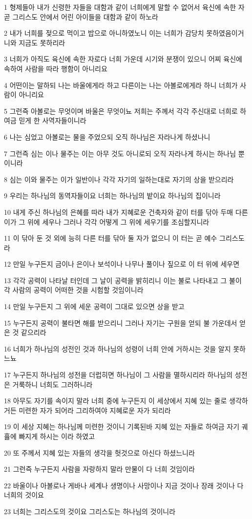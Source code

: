 \par 1 형제들아 내가 신령한 자들을 대함과 같이 너희에게 말할 수 없어서 육신에 속한 자 곧 그리스도 안에서 어린 아이들을 대함과 같이 하노라
\par 2 내가 너희를 젖으로 먹이고 밥으로 아니하였노니 이는 너희가 감당치 못하였음이거니와 지금도 못하리라
\par 3 너희가 아직도 육신에 속한 자로다 너희 가운데 시기와 분쟁이 있으니 어찌 육신에 속하여 사람을 따라 행함이 아니리요
\par 4 어떤이는 말하되 나는 바울에게라 하고 다른이는 나는 아볼로에게라 하니 너희가 사람이 아니리요
\par 5 그런즉 아볼로는 무엇이며 바울은 무엇이뇨 저희는 주께서 각각 주신대로 너희로 하여금 믿게 한 사역자들이니라
\par 6 나는 심었고 아볼로는 물을 주었으되 오직 하나님은 자라나게 하셨나니
\par 7 그런즉 심는 이나 물주는 이는 아무 것도 아니로되 오직 자라나게 하시는 하나님 뿐이니라
\par 8 심는 이와 물주는 이가 일반이나 각각 자기의 일하는대로 자기의 상을 받으리라
\par 9 우리는 하나님의 동역자들이요 너희는 하나님의 밭이요 하나님의 집이니라
\par 10 내게 주신 하나님의 은혜를 따라 내가 지혜로운 건축자와 같이 터를 닦아 두매 다른이가 그 위에 세우나 그러나 각각 어떻게 그 위에 세우기를 조심할지니라
\par 11 이 닦아 둔 것 외에 능히 다른 터를 닦아 둘 자가 없으니 이 터는 곧 예수 그리스도라
\par 12 만일 누구든지 금이나 은이나 보석이나 나무나 풀이나 짚으로 이 터 위에 세우면
\par 13 각각 공력이 나타날 터인데 그 날이 공력을 밝히리니 이는 불로 나타내고 그 불이 각 사람의 공력이 어떠한 것을 시험할 것임이니라
\par 14 만일 누구든지 그 위에 세운 공력이 그대로 있으면 상을 받고
\par 15 누구든지 공력이 불타면 해를 받으리니 그러나 자기는 구원을 얻되 불 가운데서 얻은 것 같으리라
\par 16 너희가 하나님의 성전인 것과 하나님의 성령이 너희 안에 거하시는 것을 알지 못하느뇨
\par 17 누구든지 하나님의 성전을 더럽히면 하나님이 그 사람을 멸하시리라 하나님의 성전은 거룩하니 너희도 그러하니라
\par 18 아무도 자기를 속이지 말라 너희 중에 누구든지 이 세상에서 지혜 있는 줄로 생각하거든 미련한 자가 되어라 그리하여야 지혜로운 자가 되리라
\par 19 이 세상 지혜는 하나님께 미련한 것이니 기록된바 지혜 있는 자들로 하여금 자기 궤휼에 빠지게 하시는 이라 하였고
\par 20 또 주께서 지혜 있는 자들의 생각을 헛것으로 아신다 하셨느니라
\par 21 그런즉 누구든지 사람을 자랑하지 말라 만물이 다 너희 것임이라
\par 22 바울이나 아볼로나 게바나 세계나 생명이나 사망이나 지금 것이나 장래 것이나 다 너희의 것이요
\par 23 너희는 그리스도의 것이요 그리스도는 하나님의 것이니라

